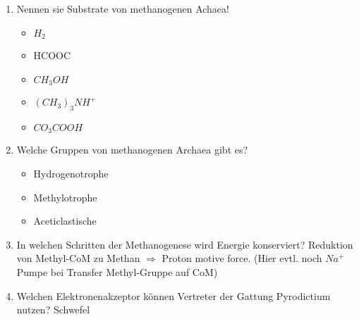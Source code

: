 \begin{enumerate}
	\item Nennen sie Substrate von methanogenen Achaea!
		\begin{itemize}
			\item $H_2$
			\item HCOOC
			\item $CH_3OH$
			\item $(CH_3)_3NH^+$
			\item $CO_3COOH$
		\end{itemize}
	\item Welche Gruppen von methanogenen Archaea gibt es?
		\begin{itemize}
			\item Hydrogenotrophe
			\item Methylotrophe
			\item Aceticlastische
		\end{itemize}
	\item In welchen Schritten der Methanogenese wird Energie konserviert?
		Reduktion von Methyl-CoM zu Methan $\Rightarrow$ Proton motive force. (Hier evtl. noch $Na^+$ Pumpe bei Transfer Methyl-Gruppe auf CoM)

	\item Welchen Elektronenakzeptor können Vertreter der Gattung Pyrodictium nutzen?
		Schwefel 
\end{enumerate}
